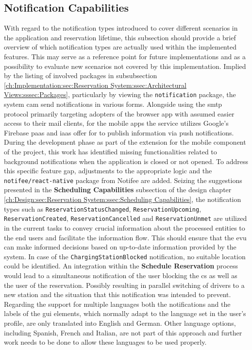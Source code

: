 \newpage

\subsection{Notification Capabilities}
\label{ch:Implementation:sec:Reservation System:ssec:Notification Capabilities}

With regard to the notification types introduced to cover different scenarios in the application and reservation lifetime, this subsection should provide a brief overview of which notification types are actually used within the implemented features.
This may serve as a reference point for future implementations and as a possibility to evaluate new scenarios not covered by this implementation.
Implied by the listing of involved packages in subsubsection \ref{ch:Implementation:sec:Reservation System:ssec:Architectural Views:sssec:Packages}, particularly by viewing the \texttt{notification} package, the system cam send notifications in various forms.
Alongside using the \acrshort{smtp} protocol \cite{klensin_simple_2008} primarily targeting adopters of the browser app with assumed easier access to their mail clients, for the mobile apps the service utilizes Google's Firebase \cite{noauthor_firebase_nodate} \acrshort{paas} and \acrshort{iaas} offer for to publish information via push notifications.
During the development phase as part of the extension for the mobile component of the project, this work has identified missing functionalities related to background notifications when the application is closed or not opened. To address this specific feature gap, adjustments to the appropriate logic and the \texttt{notifee/react-native} package from Notifee \cite{noauthor_notifee_nodate} are added.
Seizing the suggestions presented in the \textbf{Scheduling Capabilities} subsection of the design chapter \ref{ch:Design:sec:Reservation System:ssec:Scheduling Capabilities}, the notification types such as \texttt{ReservationStatusChanged}, \texttt{ReservationUpcoming}, \texttt{ReservationCreated}, \texttt{ReservationCancelled} and \texttt{ReservationUnmet} are utilized in the current tasks to convey crucial information about the processed entities to the end users and facilitate the information flow.
This should ensure that the \acrshort{evu} can make informed decisions based on up-to-date information provided by the system.
In case of the \texttt{ChargingStationBlocked} notification, no suitable location could be identified. An integration within the \textbf{Schedule Reservation} process would lead to a simultaneous notification of the user blocking the \acrshort{cs} as well as the user of the reservation. 
Possibly resulting in parallel switching of drivers to a new station and the situation that this notification was intended to prevent. \\
\noindent Regarding the support for multiple languages both the notifications and the labels of the \acrshort{gui} elements, which normally adapt to the language set in the user's profile, are only translated into English and German.
Other language options, including Spanish, French and Italian, are not part of this approach and further work needs to be done to allow these languages to be used properly.

